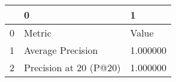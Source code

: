 \begin{tabular}{lll}
\toprule
 & 0 & 1 \\
\midrule
0 & Metric & Value \\
1 & Average Precision & 1.000000 \\
2 & Precision at 20 (P@20) & 1.000000 \\
\bottomrule
\end{tabular}
